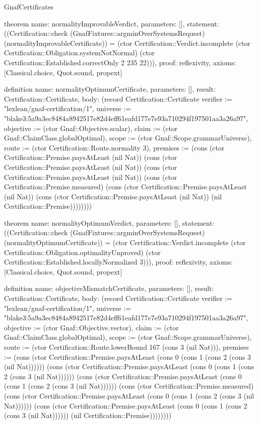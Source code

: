 \begin{lexlean}{GnafCertificates}
\begin{semanticmodule}
theorem{
  name: normalityImprovableVerdict,
  parameters: [],
  statement: ((Certification::check (GnafFixtures::argminOverSystemsRequest) (normalityImprovableCertificate)) = (ctor Certification::Verdict.incomplete (ctor Certification::Obligation.systemNotNormal) (ctor Certification::Established.correctOnly 2 235 22))),
  proof: reflexivity{},
  axioms: [Classical.choice, Quot.sound, propext]
}

definition{
  name: normalityOptimumCertificate,
  parameters: [],
  result: Certification::Certificate,
  body: (record Certification::Certificate {verifier := "lexlean/gnaf-certification/1", universe := "blake3:5a9a3ec8484a8942517e82d4eff61eafd177e7e93a710294f197501aa3a26a97", objective := (ctor Gnaf::Objective.scalar), claim := (ctor Gnaf::ClaimClass.globalOptimal), scope := (ctor Gnaf::Scope.grammarUniverse), route := (ctor Certification::Route.normality 3), premises := (cons (ctor Certification::Premise.paysAtLeast (nil Nat)) (cons (ctor Certification::Premise.paysAtLeast (nil Nat)) (cons (ctor Certification::Premise.paysAtLeast (nil Nat)) (cons (ctor Certification::Premise.measured) (cons (ctor Certification::Premise.paysAtLeast (nil Nat)) (cons (ctor Certification::Premise.paysAtLeast (nil Nat)) (nil Certification::Premise)))))))})
}

theorem{
  name: normalityOptimumVerdict,
  parameters: [],
  statement: ((Certification::check (GnafFixtures::argminOverSystemsRequest) (normalityOptimumCertificate)) = (ctor Certification::Verdict.incomplete (ctor Certification::Obligation.optimalityUnproved) (ctor Certification::Established.locallyNormalized 3))),
  proof: reflexivity{},
  axioms: [Classical.choice, Quot.sound, propext]
}

definition{
  name: objectiveMismatchCertificate,
  parameters: [],
  result: Certification::Certificate,
  body: (record Certification::Certificate {verifier := "lexlean/gnaf-certification/1", universe := "blake3:5a9a3ec8484a8942517e82d4eff61eafd177e7e93a710294f197501aa3a26a97", objective := (ctor Gnaf::Objective.vector), claim := (ctor Gnaf::ClaimClass.globalOptimal), scope := (ctor Gnaf::Scope.grammarUniverse), route := (ctor Certification::Route.lowerBound 167 (cons 3 (nil Nat))), premises := (cons (ctor Certification::Premise.paysAtLeast (cons 0 (cons 1 (cons 2 (cons 3 (nil Nat)))))) (cons (ctor Certification::Premise.paysAtLeast (cons 0 (cons 1 (cons 2 (cons 3 (nil Nat)))))) (cons (ctor Certification::Premise.paysAtLeast (cons 0 (cons 1 (cons 2 (cons 3 (nil Nat)))))) (cons (ctor Certification::Premise.measured) (cons (ctor Certification::Premise.paysAtLeast (cons 0 (cons 1 (cons 2 (cons 3 (nil Nat)))))) (cons (ctor Certification::Premise.paysAtLeast (cons 0 (cons 1 (cons 2 (cons 3 (nil Nat)))))) (nil Certification::Premise)))))))})
}


\end{semanticmodule}
\end{lexlean}
